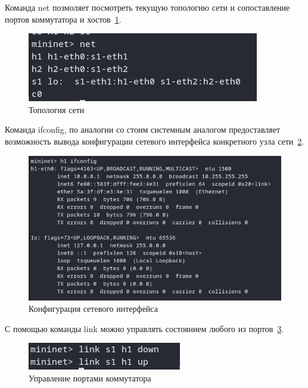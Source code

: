 \documentclass[bachelor, och, coursework]{SCWorks}
\begin{document}
Команда net позмоляет посмотреть текущую топологию сети и сопоставление портов коммутатора и хостов~\ref{fig:mn-net}.
\begin{figure}[H]
    \centering
    \includegraphics[width=\textwidth]{mn-net}
    \caption{Топология сети}\label{fig:mn-net}
\end{figure}

Команда ifconfig, по аналогии со стоим системным аналогом предоставляет возможность вывода конфигурации сетевого интерфейса конкретного узла сети~\ref{fig:mn-ifconfig}.
\begin{figure}[H]
    \centering
    \includegraphics[width=\textwidth]{mn-ifconfig}
    \caption{Конфигурация сетевого интерфейса}\label{fig:mn-ifconfig}
\end{figure}

С помощью команды link можно управлять состоянием любого из портов~\ref{fig:mn-link}.
\begin{figure}[H]
    \centering
    \includegraphics[width=\textwidth]{mn-link}
    \caption{Управление портами коммутатора}\label{fig:mn-link}
\end{figure}
\end{document}
